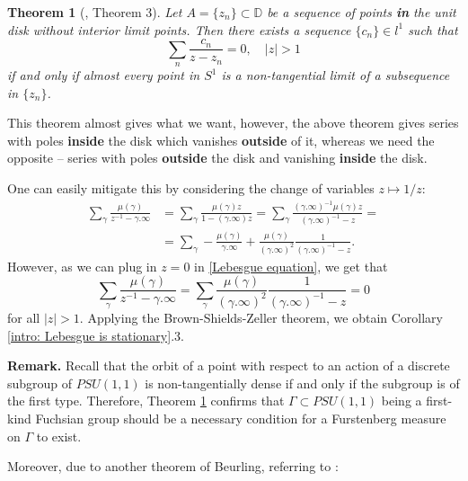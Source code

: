 \documentclass[11pt]{article}
\newtheorem{theorem}{Theorem}[section]
\begin{document}
\begin{theorem}[\cite{brownsums}, Theorem 3]
	\label{non-tangential equiv rep}
	Let $A = \{ z_n \} \subset \mathbb{D}$ be a sequence of points \textbf{in} the unit disk without interior limit points. Then there exists a sequence $\{c_n\} \in l^1$ such that
	\[
	\sum_n \frac{c_n}{z - z_n} = 0, \quad |z| > 1
	\]
	if and only if almost every point in $S^1$ is a non-tangential limit of a subsequence in $\{z_n\}$.
\end{theorem}

This theorem almost gives what we want, however, the above theorem gives series with poles \textbf{inside} the disk which vanishes \textbf{outside} of it, whereas we need the opposite -- series with poles \textbf{outside} the disk and vanishing \textbf{inside} the disk.

One can easily mitigate this by considering the change of variables $z \mapsto 1/z$:
\[
\begin{aligned}
	\sum_{\gamma} \frac{\mu(\gamma)}{z^{-1} - \gamma.\infty} &= \sum_{\gamma} \frac{\mu(\gamma) z}{1 - (\gamma.\infty) z} = \sum_{\gamma} \frac{(\gamma.\infty)^{-1}  \mu(\gamma) z}{(\gamma.\infty)^{-1} -  z} = \\ 
	&= \sum_{\gamma} - \frac{\mu(\gamma)}{\gamma.\infty} + \frac{\mu(\gamma)}{(\gamma.\infty)^2} \frac{1}{(\gamma.\infty)^{-1} - z}.
\end{aligned}
\]
However, as we can plug in $z = 0$ in \eqref{Lebesgue equation}, we get that
\[
\sum_{\gamma} \frac{\mu(\gamma)}{z^{-1} - \gamma.\infty} = \sum_{\gamma}\frac{\mu(\gamma)}{(\gamma.\infty)^2} \frac{1}{(\gamma.\infty)^{-1} - z} = 0
\]
for all $|z| > 1$. Applying the Brown-Shields-Zeller theorem, we obtain Corollary \ref{intro: Lebesgue is stationary}.3.

\textbf{Remark.} Recall that the orbit of a point with respect to an action of a discrete subgroup of $PSU(1,1)$ is non-tangentially dense if and only if the subgroup is of the first type. Therefore, Theorem \ref{non-tangential equiv rep} confirms that $\Gamma \subset PSU(1,1)$ being a first-kind Fuchsian group should be a necessary condition for a Furstenberg measure on $\Gamma$ to exist.

Moreover, due to another theorem of Beurling, referring to \cite[Corollary 4.2.24]{Shapiro1968}:
\end{document}
